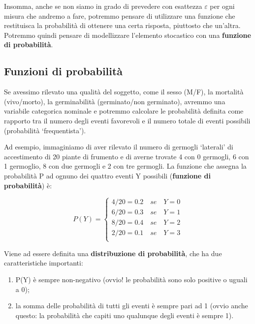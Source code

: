 \documentclass[a4paper,12pt,oneside]{book}
\providecommand{\tightlist}{%
  \setlength{\itemsep}{0pt}\setlength{\parskip}{0pt}}
\begin{document}
Insomma, anche se non siamo in grado di prevedere con esattezza \(\varepsilon\) per ogni misura che andremo a fare, potremmo pensare di utilizzare una funzione che restituisca la probabilità di ottenere una certa risposta, piuttosto che un'altra. Potremmo quindi pensare di modellizzare l'elemento stocastico con una \textbf{funzione di probabilità}.

\hypertarget{funzioni-di-probabilituxe0}{%
\subsection{Funzioni di probabilità}\label{funzioni-di-probabilituxe0}}

Se avessimo rilevato una qualità del soggetto, come il sesso (M/F), la mortalità (vivo/morto), la germinabilità (germinato/non germinato), avremmo una variabile categorica nominale e potremmo calcolare le probabilità definita come rapporto tra il numero degli eventi favorevoli e il numero totale di eventi possibili (probabilità `frequentista').

Ad esempio, immaginiamo di aver rilevato il numero di germogli `laterali' di accestimento di 20 piante di frumento e di averne trovate 4 con 0 germogli, 6 con 1 germoglio, 8 con due germogli e 2 con tre germogli. La funzione che assegna la probabilità P ad ognuno dei quattro eventi Y possibili (\textbf{funzione di probabilità}) è:

\[
P(Y) = \left\{ \begin{array}{l}
 4/20 = 0.2 \,\,\,\,\,\,se\,\,\,\,\,\,Y = 0 \\ 
 6/20 = 0.3 \,\,\,\,\,\,se\,\,\,\,\,\,Y = 1 \\ 
 8/20 = 0.4\,\,\,\,\,\,se\,\,\,\,\,\, Y = 2 \\ 
 2/20 = 0.1 \,\,\,\,\,\,se\,\,\,\,\,\,Y = 3 \\ 
 \end{array} \right.
\]

Viene ad essere definita una \textbf{distribuzione di probabilità}, che ha due caratteristiche importanti:

\begin{enumerate}
\def\labelenumi{\arabic{enumi}.}
\tightlist
\item
  P(Y) è sempre non-negativo (ovvio! le probabilità sono solo positive o uguali a 0);
\item
  la somma delle probabilità di tutti gli eventi è sempre pari ad 1 (ovvio anche questo: la probabilità che capiti uno qualunque degli eventi è sempre 1).
\end{enumerate}
\end{document}
